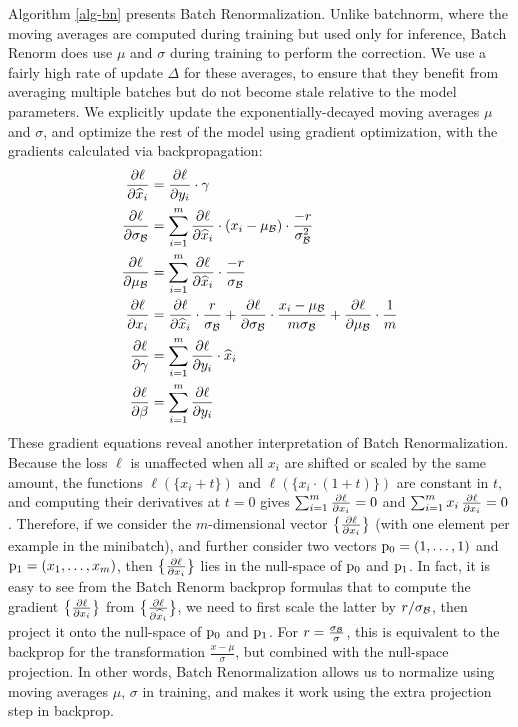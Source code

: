 Algorithm \ref{alg-bn} presents Batch Renormalization. Unlike batchnorm, where the moving averages are computed during training but used only for inference, Batch Renorm does use $\mu$ and $\sigma$ during training to perform the correction. We use a fairly high rate of update $\Delta$ for these averages, to ensure that they benefit from averaging multiple batches but do not become stale relative to the model parameters. We explicitly update the exponentially-decayed moving averages $\mu$ and $\sigma$, and optimize the rest of the model using gradient optimization, with the gradients calculated via backpropagation:
\begin{align*}
\frac{\partial \ell}{\partial \widehat{x}_i} &= \frac{\partial \ell}{\partial y_i}\cdot \gamma \\ 
\frac{\partial \ell}{\partial \sigma_{\mathcal{B}}}
&= \sum_{i=1}^m \frac{\partial \ell}{\partial \widehat{x}_i}\cdot(x_i-\mu_{\mathcal{B}})\cdot
\frac{-r}{\sigma_{\mathcal{B}}^2} \\ 
\frac{\partial \ell}{\partial \mu_{\mathcal{B}}} &=
\sum_{i=1}^m \frac{\partial \ell}{\partial \widehat{x}_i}\cdot
\frac{-r}{\sigma_{\mathcal{B}}}\\
   \frac{\partial \ell}{\partial x_i} &= \frac{\partial \ell}{\partial \widehat{x}_i} \cdot
\frac{r}{\sigma_{\mathcal{B}}} + \frac{\partial \ell}{\partial \sigma_{\mathcal{B}}}\cdot
\frac{x_i-\mu_{\mathcal{B}}}{m \sigma_{\mathcal{B}}} + \frac{\partial \ell}{\partial \mu_{\mathcal{B}}}\cdot \frac{1}{m}\\
\frac{\partial \ell}{\partial \gamma}&= \sum_{i=1}^m \frac{\partial \ell}{\partial y_i} \cdot \widehat{x}_i
  \\ 
  \frac{\partial \ell}{\partial \beta} &= \sum_{i=1}^m \frac{\partial \ell}{\partial y_i}
\end{align*}
These gradient equations reveal another interpretation of Batch Renormalization. Because the loss $\ell$ is unaffected when all $x_i$ are shifted or scaled by the same amount, 
the functions $\ell(\{x_i+t\})$ and $\ell(\{x_i\cdot(1+t)\})$ are constant in $t$, and computing their derivatives at $t=0$ gives $\sum_{i=1}^m \frac{\partial \ell}{\partial x_i} = 0$ and $\sum_{i=1}^m x_i\,\frac{\partial \ell}{\partial x_i} = 0$. Therefore, if we consider the $m$-dimensional vector $\big\{\frac{\partial \ell}{\partial x_i}\big\}$ (with one element per example in the minibatch), and further consider two vectors 
$\mathrm{p}_0=(1,\ldots,1)$ and $\mathrm{p}_1=(x_1,\ldots,x_m)$, then $\big\{\frac{\partial \ell}{\partial x_i}\big\}$ lies in the null-space of $\mathrm{p}_0$ and $\mathrm{p}_1$.
In fact, it is easy to see from the Batch Renorm backprop formulas that to compute the gradient $\big\{\frac{\partial \ell}{\partial x_i}\big\}$ from  $\big\{\frac{\partial \ell}{\partial \widehat{x}_i}\big\}$, we need to first scale the latter by $r/\sigma_{\mathcal{B}}$, then project it onto the null-space of $\mathrm{p}_0$ and $\mathrm{p}_1$. For $r=\frac{\sigma_{\mathcal{B}}}{\sigma}$, this is equivalent to the backprop for the transformation $\frac{x-\mu}{\sigma}$, but combined with the null-space projection. In other words, Batch Renormalization allows us to normalize using moving averages $\mu$, $\sigma$ in training, and makes it work using the extra projection step in backprop.

